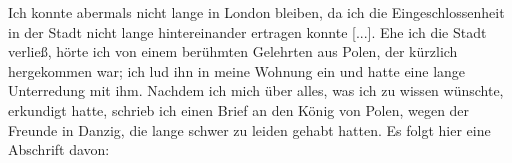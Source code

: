 Ich konnte abermals nicht lange in London bleiben, da ich
die Eingeschlossenheit in der Stadt nicht lange hintereinander
ertragen konnte [...]. Ehe ich die Stadt 
verließ, hörte ich von
einem berühmten Gelehrten aus Polen, der kürzlich hergekommen
war; ich lud ihn in meine Wohnung ein und hatte eine lange
Unterredung mit ihm. Nachdem ich mich über alles, was ich zu
wissen wünschte, erkundigt hatte, schrieb ich einen Brief an den
König von Polen, wegen der Freunde in Danzig, die lange
schwer zu leiden gehabt hatten. Es folgt hier eine Abschrift
davon:

